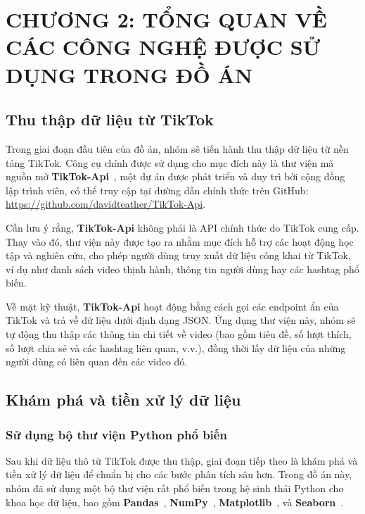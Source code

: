 \section{CHƯƠNG 2: TỔNG QUAN VỀ CÁC CÔNG NGHỆ ĐƯỢC SỬ DỤNG TRONG ĐỒ ÁN} \label{sec:technology}

\subsection{Thu thập dữ liệu từ TikTok}

Trong giai đoạn đầu tiên của đồ án, nhóm sẽ tiến hành thu thập dữ liệu từ nền tảng TikTok. Công cụ chính được sử dụng cho mục đích này là thư viện mã nguồn mở \textbf{TikTok-Api}~\cite{tiktok_api}, một dự án được phát triển và duy trì bởi cộng đồng lập trình viên, có thể truy cập tại đường dẫn chính thức trên GitHub: \url{https://github.com/davidteather/TikTok-Api}.

Cần lưu ý rằng, \textbf{TikTok-Api} không phải là API chính thức do TikTok cung cấp. Thay vào đó, thư viện này được tạo ra nhằm mục đích hỗ trợ các hoạt động học tập và nghiên cứu, cho phép người dùng truy xuất dữ liệu công khai từ TikTok, ví dụ như danh sách video thịnh hành, thông tin người dùng hay các hashtag phổ biến.

Về mặt kỹ thuật, \textbf{TikTok-Api} hoạt động bằng cách gọi các endpoint ẩn của TikTok và trả về dữ liệu dưới định dạng JSON. Ứng dụng thư viện này, nhóm sẽ tự động thu thập các thông tin chi tiết về video (bao gồm tiêu đề, số lượt thích, số lượt chia sẻ và các hashtag liên quan, v.v.), đồng thời lấy dữ liệu của những người dùng có liên quan đến các video đó.

\subsection{Khám phá và tiền xử lý dữ liệu}

\subsubsection{Sử dụng bộ thư viện Python phổ biến}

Sau khi dữ liệu thô từ TikTok được thu thập, giai đoạn tiếp theo là khám phá và tiền xử lý dữ liệu để chuẩn bị cho các bước phân tích sâu hơn. Trong đồ án này, nhóm đã sử dụng một bộ thư viện rất phổ biến trong hệ sinh thái Python cho khoa học dữ liệu, bao gồm \textbf{Pandas}~\cite{pandas}, \textbf{NumPy}~\cite{numpy}, \textbf{Matplotlib}~\cite{matplotlib}, và \textbf{Seaborn}~\cite{seaborn}.

